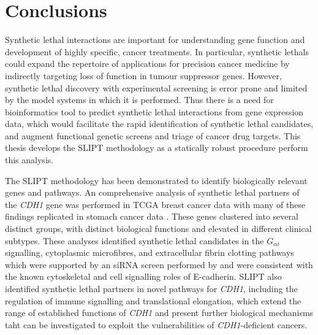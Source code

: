 \clearpage
\section{Conclusions}
\label{chap:conclusion}

Synthetic lethal interactions are important for understanding gene function and development of highly specific,  cancer \glspl{treatment}. In particular, \glspl{synthetic lethal} could expand the repertoire of applications for precision cancer medicine by indirectly targeting loss of function in \gls{tumour suppressor} genes.  However, \gls{synthetic lethal} discovery with experimental screening is error prone and limited by the model systems in which it is performed. Thus there is a need for \gls{bioinformatics} tool to predict \gls{synthetic lethal} interactions from \gls{gene expression} data, which would facilitate the rapid identification of \gls{synthetic lethal} candidates, and augment functional genetic screens and triage of cancer drug targets. This thesis develops the \acrfull{SLIPT} methodology as a statically robust procedure perform this analysis.

The \gls{SLIPT} methodology has been demonstrated to identify biologically relevant genes and pathways. An comprehensive analysis of \gls{synthetic lethal} partners of the \textit{CDH1} gene was performed in \gls{TCGA} breast cancer data \citep{TCGA2012} with many of these findings replicated in stomach cancer data \citep{TCGA2014GC}. These genes clustered into several distinct groups, with distinct biological functions and elevated  in different clinical subtypes.  These analyses identified \gls{synthetic lethal} candidates in the $G_{\alpha i}$ signalling, cytoplasmic microfibres, and extracellular fibrin clotting pathways which were supported by an \gls{siRNA} screen performed by \citet{Telford2015} and were consistent with the known cytoskeletal and cell signalling roles of \gls{E-cadherin}. 
\gls{SLIPT} also identified \gls{synthetic lethal} partners in novel pathways for \textit{CDH1}, including the regulation of immune signalling and translational elongation, which extend the range of established functions of \textit{CDH1} and present further biological mechanisms %
taht can be investigated to exploit the
vulnerabilities of \textit{CDH1}-deficient cancers.


